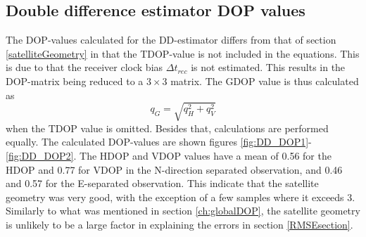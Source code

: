\subsection{Double difference estimator DOP values}\label{ch:DD_DOP}
The DOP-values calculated for the DD-estimator differs from that of section \ref{satelliteGeometry} in that the TDOP-value is not included in the equations. This is due to that the receiver clock bias $\Delta t_{rec}$ is not estimated. This results in the DOP-matrix being reduced to a $3\times3$ matrix. The GDOP value is thus calculated as $$q_G=\sqrt{q^2_H+q^2_V}$$ when the TDOP value is omitted. Besides that, calculations are performed equally.
The calculated DOP-values are shown figures \ref{fig:DD_DOP1}-\ref{fig:DD_DOP2}. The HDOP and VDOP values have a mean of 0.56 for the HDOP and 0.77 for VDOP in the N-direction separated observation, and 0.46 and 0.57 for the E-separated observation. This indicate that the satellite geometry was very good, with the exception of a few samples where it exceeds 3. Similarly to what was mentioned in section \ref{ch:globalDOP}, the satellite geometry is unlikely to be a large factor in explaining the errors in section \ref{RMSEsection}.
